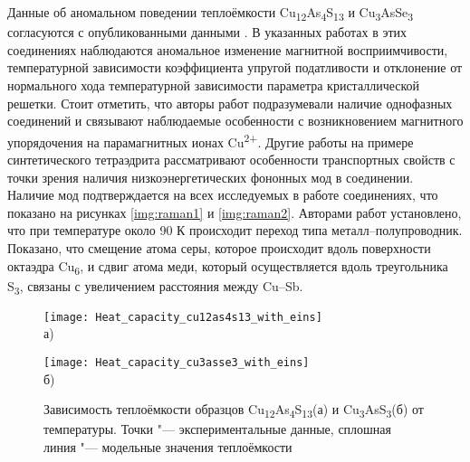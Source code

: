 Данные об аномальном поведении теплоёмкости Cu\textsubscript{12}As\textsubscript{4}S\textsubscript{13} и Cu\textsubscript{3}AsSe\textsubscript{3} согласуются с опубликованными данными \cite{bab_1982,bab_81}.
В указанных работах в этих соединениях наблюдаются аномальное изменение магнитной восприимчивости, температурной зависимости коэффициента упругой податливости и отклонение от нормального хода температурной зависимости параметра кристаллической решетки.
Стоит отметить, что авторы работ \cite{bab_1982,bab_81} подразумевали наличие однофазных соединений и связывают наблюдаемые особенности с возникновением магнитного упорядочения на парамагнитных ионах Cu\textsuperscript{2+}.
Другие работы \cite{Lara-Curzio2014,Nasonova2016} на примере синтетического тетраэдрита рассматривают особенности транспортных свойств  с точки зрения наличия низкоэнергетических фононных мод в соединении. Наличие мод подтверждается на всех исследуемых в работе соединениях, что показано на рисунках \ref{img:raman1} и \ref{img:raman2}.
Авторами работ \cite{Lara-Curzio2014,Nasonova2016} установлено, что при температуре около 90 К происходит переход типа металл--полупроводник. Показано, что смещение атома серы, которое происходит вдоль поверхности октаэдра Cu\textsubscript{6}, и сдвиг атома меди, который осуществляется вдоль треугольника S\textsubscript{3}, связаны с увеличением расстояния между Cu--Sb.

\begin{figure}[p!]
  \begin{minipage}[ht]{0.9\linewidth}\centering
    \texttt{[image: Heat\_capacity\_cu12as4s13\_with\_eins]} \\ а)
  \end{minipage}
  \vfill
  \begin{minipage}[ht]{0.9\linewidth}\centering
    \texttt{[image: Heat\_capacity\_cu3asse3\_with\_eins]} \\ б)
  \end{minipage}

      \caption[Зависимость теплоёмкости образцов Cu\textsubscript{12}As\textsubscript{4}S\textsubscript{13}(а) и Cu\textsubscript{3}AsS\textsubscript{3}(б) от температуры. Точки "--- экспериментальные данные, сплошная линия "--- модельные значения теплоёмкости]{Зависимость теплоёмкости образцов Cu\textsubscript{12}As\textsubscript{4}S\textsubscript{13}(а) и Cu\textsubscript{3}AsS\textsubscript{3}(б) от температуры. Точки "--- экспериментальные данные, сплошная линия "--- модельные значения теплоёмкости}
    \label{img:heat_en}
\end{figure}


